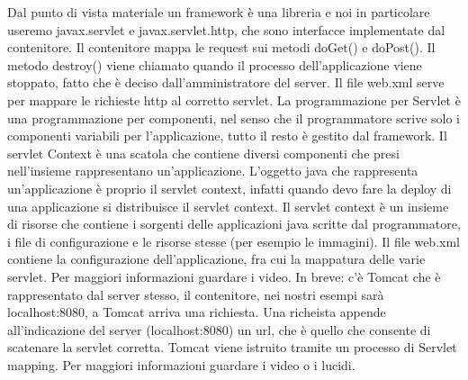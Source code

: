 Dal punto di vista materiale un framework è una libreria e noi in particolare useremo javax.servlet e javax.servlet.http, che sono interfacce implementate dal contenitore.\newline
Il contenitore mappa le request sui metodi doGet() e doPost().\newline
Il metodo destroy() viene chiamato quando il processo dell'applicazione viene stoppato, fatto che è deciso dall'amministratore del server.\newline
Il file web.xml serve per mappare le richieste http al corretto servlet.\newline
La programmazione per Servlet è una programmazione per componenti, nel senso che il programmatore scrive solo i componenti variabili per l'applicazione, tutto il resto è gestito dal framework.\newline
Il servlet Context è una scatola che contiene diversi componenti che presi nell'insieme rappresentano un'applicazione. L'oggetto java che rappresenta un'applicazione è proprio il servlet context, infatti quando devo fare la deploy di una applicazione si distribuisce il servlet context. Il servlet context è un insieme di risorse che contiene i sorgenti delle applicazioni java scritte dal programmatore, i file di configurazione e le risorse stesse (per esempio le immagini).\newline
Il file web.xml contiene la configurazione dell'applicazione, fra cui la mappatura delle varie servlet. Per maggiori informazioni guardare i video. In breve: c'è Tomcat che è rappresentato dal server stesso, il contenitore, nei nostri esempi sarà localhost:8080, a Tomcat arriva una richiesta. Una richeista appende all'indicazione del server (localhost:8080) un url, che è quello che consente di scatenare la servlet corretta. Tomcat viene istruito tramite un processo di Servlet mapping. Per maggiori informazioni guardare i video o i lucidi.\newline
